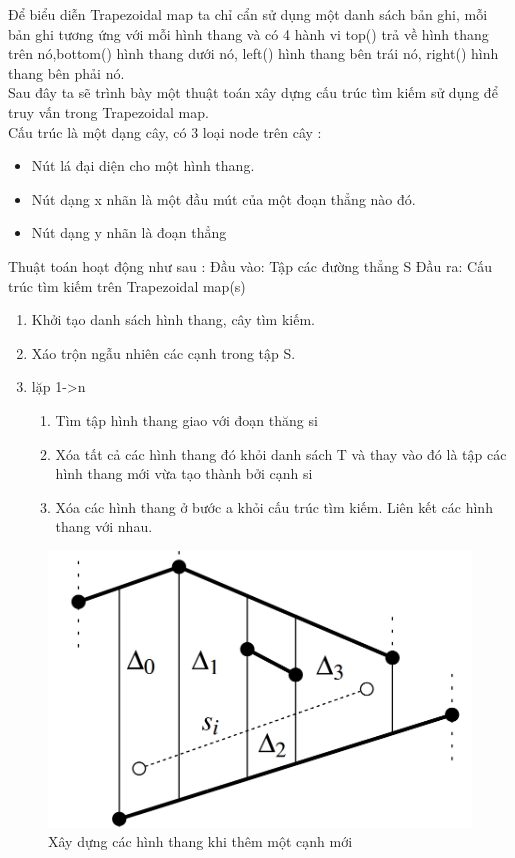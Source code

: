 \documentclass[a4paper,12pt]{report}
\begin{document}
Để biểu diễn Trapezoidal map ta chỉ cẩn sử dụng một danh sách bản ghi, mỗi bản ghi tương ứng với mỗi hình thang và có 4 hành vi top() trả về hình thang trên nó,bottom() hình thang dưới nó, left() hình thang bên trái nó, right() hình thang bên phải nó. \\

Sau đây ta sẽ trình bày một thuật toán xây dựng cấu trúc tìm kiếm sử dụng để truy vấn trong Trapezoidal map.\\

Cấu trúc là một dạng cây, có 3 loại node trên cây :
\begin{itemize}
\item Nút lá đại diện cho một hình thang.
\item Nút dạng x nhãn là một đầu mút của một đoạn thẳng nào đó.
\item Nút dạng y nhãn là đoạn thẳng
\end{itemize}

Thuật toán hoạt động như sau :
Đầu vào: Tập các đường thẳng S
Đầu ra: Cấu trúc tìm kiếm trên Trapezoidal map(s)

\begin{enumerate}
\item Khởi tạo danh sách hình thang, cây tìm kiếm.
\item Xáo trộn  ngẫu nhiên các cạnh trong tập S.
\item lặp 1->n  
\begin{enumerate}
\item Tìm tập hình thang giao với đoạn thăng si
\item Xóa tất cả các hình thang đó khỏi danh sách T và thay vào đó là tập các hình thang mới vừa tạo thành bởi cạnh si
\item Xóa các hình thang ở bước a khỏi cấu trúc tìm kiếm. Liên kết các hình thang với nhau.

		
\end{enumerate}
\end{enumerate}
\begin{figure}[H]
\label{object_pic}
\centering
\includegraphics[scale=0.4]{trmap2.png}
\caption{Xây dựng các hình thang khi thêm một cạnh mới}

\end{figure}
\end{document}
